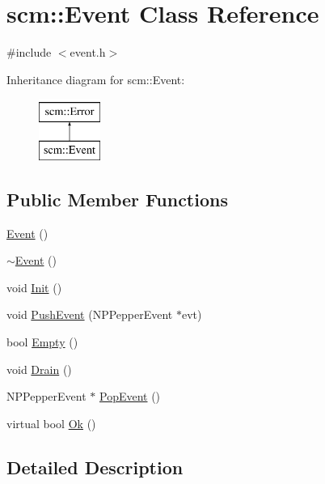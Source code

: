 \hypertarget{classscm_1_1_event}{
\section{scm::Event Class Reference}
\label{classscm_1_1_event}
}


{\ttfamily \#include $<$event.h$>$}

Inheritance diagram for scm::Event:\begin{figure}[H]
\begin{center}
\leavevmode
\includegraphics[height=2cm]{classscm_1_1_event}
\end{center}
\end{figure}
\subsection*{Public Member Functions}
\begin{DoxyCompactItemize}
\item 
\hyperlink{classscm_1_1_event_ae0b0fbe856c9fbce52b50e08860946e8}{Event} ()
\item 
\hyperlink{classscm_1_1_event_a4f22bf217daf2b5e3670e987579fb152}{$\sim$Event} ()
\item 
void \hyperlink{classscm_1_1_event_a2dfdf12d5b7918b2102e7ce1c4142ed3}{Init} ()
\item 
void \hyperlink{classscm_1_1_event_a1e1aa9fbe9b5e7e7c9b0ff8f0ba74cd2}{PushEvent} (NPPepperEvent $\ast$evt)
\item 
bool \hyperlink{classscm_1_1_event_ae736ee83efd335726cad841b6082e491}{Empty} ()
\item 
void \hyperlink{classscm_1_1_event_aba1e9492e1d03bd67afb9c8943e89fe9}{Drain} ()
\item 
NPPepperEvent $\ast$ \hyperlink{classscm_1_1_event_aaa7905956b3d789fa16cc7a73490dc5e}{PopEvent} ()
\item 
virtual bool \hyperlink{classscm_1_1_event_a95400a0d0218dfb664c028d1130a5d14}{Ok} ()
\end{DoxyCompactItemize}


\subsection{Detailed Description}


